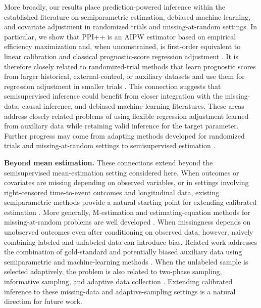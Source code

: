 \documentclass{article}
\theoremstyle{plain}
\theoremstyle{definition}
\newcommand{\1}{\mathbbm{1}}
\begin{document}
 More broadly, our results place prediction-powered inference
within the established literature on semiparametric estimation,
debiased machine learning, and covariate adjustment in randomized
trials and missing-at-random settings. In particular, we show
that PPI++ is an AIPW estimator based on empirical efficiency
maximization \citep{rubin2008empirical} and, when unconstrained, is first-order
equivalent to linear calibration and classical prognostic-score
regression adjustment
\citep{hansen2008prognostic,lin2013agnostic,schuler2022increasing}.
It is therefore closely related to randomized-trial methods
that learn prognostic scores from larger historical,
external-control, or auxiliary datasets and use them for
regression adjustment in smaller trials
\citep{hansen2008prognostic,moore2009covariate,rosenblum2009using,
benkeser2021improving,hojbjerre2025powering}.
This connection suggests that semisupervised inference could
benefit from closer integration with the missing-data,
causal-inference, and debiased machine-learning literatures.
These areas address closely related problems of using flexible
regression adjustment learned from auxiliary data while
retaining valid inference for the target parameter.
Further progress may come from adapting methods developed
for randomized trials and missing-at-random settings to
semisupervised estimation
\citep{petersen2014causal,dang2023causal,ho2023current,
smith2023application,ho2024examples}.

\textbf{Beyond mean estimation.}
These connections extend beyond the semisupervised mean-estimation
setting considered here. When outcomes or covariates are missing
depending on observed variables, or in settings involving
right-censored time-to-event outcomes and longitudinal data,
existing semiparametric methods provide a natural starting
point for extending calibrated estimation
\citep{robins1994estimation,vanderlaanunified,bang2005doubly,
moore2009increasing,rose2011targeted,van2018targeted}.
More generally, M-estimation and estimating-equation methods
for missing-at-random problems are well developed
\citep{robins1994estimation,vanderlaanunified,DoubleML}.
When missingness depends on unobserved outcomes even after
conditioning on observed data, however, naively combining
labeled and unlabeled data can introduce bias.
Related work addresses the combination of gold-standard
and potentially biased auxiliary data using semiparametric
and machine-learning methods
\citep{kallus2018removing,rosenman2025methods,
dang2025experiment,van2026adaptive}.
When the unlabeled sample is selected adaptively,
the problem is also related to two-phase sampling,
informative sampling, and adaptive data collection
\citep{van2008construction,chow2008adaptive,rose2011targeted,
malenica2021adaptive,zrnic2024active,zhang2025efficient,
liu2025robust}. Extending calibrated inference to these
missing-data and adaptive-sampling settings is a natural
direction for future work.
\end{document}
